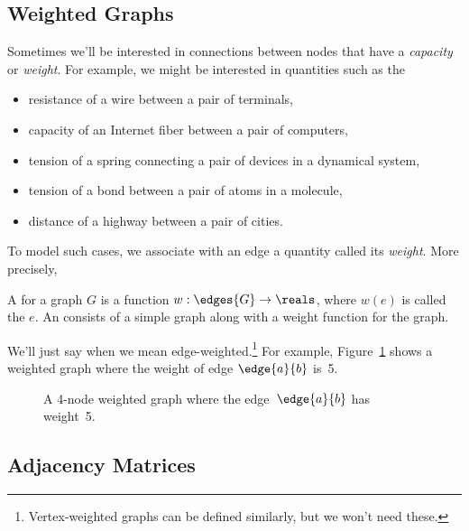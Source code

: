\begin{editingnotes}
\section{Weighted Graphs}

Sometimes we'll be interested in connections between nodes that have a
\emph{capacity} or \emph{weight}.  For example, we might be interested in
quantities such as the
\begin{itemize}

\item resistance of a wire between a pair of terminals, 

\item capacity of an Internet fiber between a pair of computers,

\item tension of a spring connecting a pair of devices in a dynamical system,

\item tension of a bond between a pair of atoms in a molecule,

\item distance of a highway between a pair of cities.

\end{itemize}
To model such cases, we associate with an edge a quantity called its
\emph{weight}.  More precisely,
\begin{definition}
  A  for a graph $G$ is a function $w: \edges{G} \to
  \reals$, where $w(e)$ is called the  $e$.
An  consists of a simple graph along with
a weight function for the graph.
\end{definition}
We'll just say  when we mean
edge-weighted.\footnote{Vertex-weighted graphs can be defined similarly,
  but we won't need these.}
For example, Figure~\ref{fig:weighted_graph} shows a weighted graph
where the weight of edge $\edge{a}{b}$ is~5.

\begin{figure}


\caption{A 4-node weighted graph where the edge~$\edge{a}{b}$ has
  weight~5.}
\label{fig:weighted_graph}
\end{figure}

\subsection{Adjacency Matrices}


\end{editingnotes}
